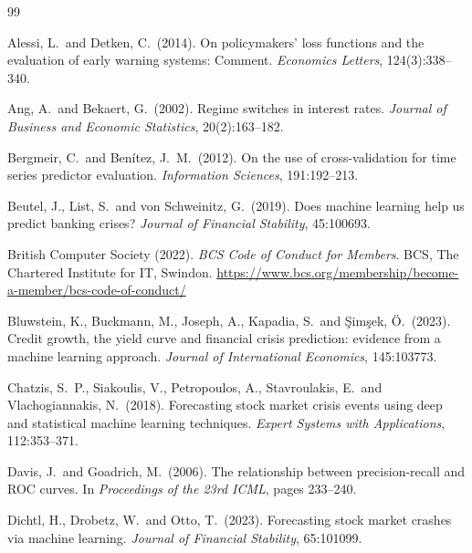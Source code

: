 \documentclass[11pt,a4paper]{article}
\begin{document}
\clearpage
\begin{thebibliography}{99}

Alessi, L.\ and Detken, C.\ (2014). On policymakers' loss functions and the
evaluation of early warning systems: Comment. \emph{Economics Letters},
124(3):338--340.

Ang, A.\ and Bekaert, G.\ (2002). Regime switches in interest rates.
\emph{Journal of Business and Economic Statistics}, 20(2):163--182.

Bergmeir, C.\ and Ben\'itez, J.\ M.\ (2012). On the use of cross-validation
for time series predictor evaluation. \emph{Information Sciences},
191:192--213.

Beutel, J., List, S.\ and von Schweinitz, G.\ (2019). Does machine learning
help us predict banking crises? \emph{Journal of Financial Stability},
45:100693.

British Computer Society (2022). \emph{BCS Code of Conduct for Members}. BCS,
The Chartered Institute for IT, Swindon.
\url{https://www.bcs.org/membership/become-a-member/bcs-code-of-conduct/}

Bluwstein, K., Buckmann, M., Joseph, A., Kapadia, S.\ and \c{S}im\c{s}ek, \"O.\
(2023). Credit growth, the yield curve and financial crisis prediction:
evidence from a machine learning approach. \emph{Journal of International
Economics}, 145:103773.

Chatzis, S.\ P., Siakoulis, V., Petropoulos, A., Stavroulakis, E.\ and
Vlachogiannakis, N.\ (2018). Forecasting stock market crisis events using
deep and statistical machine learning techniques. \emph{Expert Systems with
Applications}, 112:353--371.

Davis, J.\ and Goadrich, M.\ (2006). The relationship between precision-recall
and ROC curves. In \emph{Proceedings of the 23rd ICML}, pages 233--240.

Dichtl, H., Drobetz, W.\ and Otto, T.\ (2023). Forecasting stock market
crashes via machine learning. \emph{Journal of Financial Stability},
65:101099.


\end{thebibliography}
\end{document}
